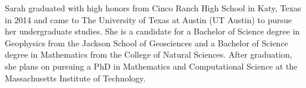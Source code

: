 Sarah graduated with high honors from Cinco Ranch High School in Katy, Texas in 2014 and came to The University of Texas at Austin (UT Austin) to pursue her undergraduate studies. 
She is a candidate for a Bachelor of Science degree in Geophysics from the Jackson School of Geosciences and a Bachelor of Science degree in Mathematics from the College of Natural Sciences.
After graduation, she plans on pursuing a PhD in Mathematics and Computational Science at the Massachusetts Institute of Technology.


